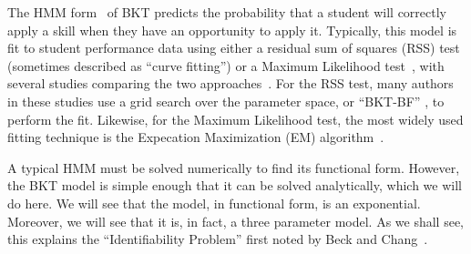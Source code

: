\documentclass[jedm,acmnow]{acmtrans2m}
\begin{document}
The HMM form~\cite{beck_identifiability:_2007} of BKT 
predicts the probability that a student will 
correctly apply a skill when they have an opportunity to apply it.
%
%
%
%
%
%
Typically, this model is fit to student performance data 
using either a residual sum of squares (RSS)
test (sometimes described as ``curve fitting'')
\cite{corbett_knowledge_1995} or a Maximum Likelihood
test~\cite{pardos_navigating_2010}, with several studies comparing the two
approaches~\cite{baker_ensembling_2011,chang_bayes_2006,pardos_ensembling_2011,pardos_sum_2012}.
For the RSS test, many authors in these studies use a grid search
over the parameter space, or ``BKT-BF'' \cite{baker_ensembling_2011}, to perform the fit.  
Likewise, for the Maximum Likelihood test, the most widely used
fitting technique is the Expecation Maximization (EM)
algorithm~\cite{dempster_maximum_1977,chang_bayes_2006}. 

A typical HMM must be solved numerically to find its functional form.
However, the BKT model is simple enough that it can be 
solved analytically, which we will do here.  We will see that the model, 
in functional form, is an exponential.  Moreover, we will see that 
it is, in fact, a three parameter model.  As we shall see, 
this explains the ``Identifiability Problem'' first noted by 
Beck and Chang~\citeyear{beck_identifiability:_2007}.
\end{document}
